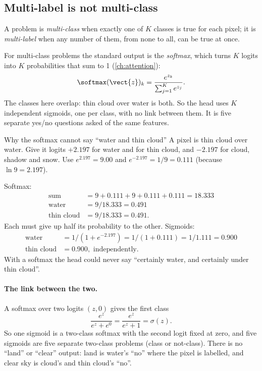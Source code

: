 \subsection{Multi-label is not multi-class}

\begin{definition}
A problem is \emph{multi-class} when exactly one of $K$ classes is true for each pixel; it is \emph{multi-label} when any number of
them, from none to all, can be true at once.
\end{definition}
For multi-class problems the standard output is the \emph{softmax}, which turns $K$ logits into $K$ probabilities that sum
to 1 (\cref{ch:attention}):
\[
  \softmax(\vect{z})_k = \frac{e^{z_k}}{\sum_{j=1}^{K} e^{z_j}}.
\]
The classes here overlap: thin cloud over water is both. So the head uses $K$ independent sigmoids, one per class, with no link between
them. It is five separate yes/no questions asked of the same features.

\begin{worked}[label={we:seghead:softmax}]{Why the softmax cannot say ``water and thin cloud''}
A pixel is thin cloud over water. Give it logits $+2.197$ for water and for thin cloud, and $-2.197$ for cloud, shadow and snow.
Use $e^{2.197} = 9.00$ and $e^{-2.197} = 1/9 = 0.111$ (because $\ln 9 = 2.197$).

Softmax:
\begin{align*}
  \text{sum} &= 9 + 0.111 + 9 + 0.111 + 0.111 = 18.333\\
  \text{water} &= 9 / 18.333 = 0.491\\
  \text{thin cloud} &= 9 / 18.333 = 0.491.
\end{align*}
Each must give up half its probability to the other. Sigmoids:
\begin{align*}
  \text{water} &= 1 / (1 + e^{-2.197}) = 1 / (1 + 0.111) = 1 / 1.111 = 0.900\\
  \text{thin cloud} &= 0.900, \text{ independently.}
\end{align*}
With a softmax the head could never say ``certainly water, and certainly under thin cloud''.
\end{worked}

\paragraph{The link between the two.} A softmax over two logits $(z, 0)$ gives the first class
\[
  \frac{e^{z}}{e^{z} + e^{0}} = \frac{e^{z}}{e^{z} + 1} = \sigma(z).
\]
So one sigmoid is a two-class softmax with the second logit fixed at zero, and five sigmoids are five separate two-class problems
(class or not-class). There is no ``land'' or ``clear'' output: land is water's ``no'' where the pixel is labelled, and clear sky is
cloud's and thin cloud's ``no''.

